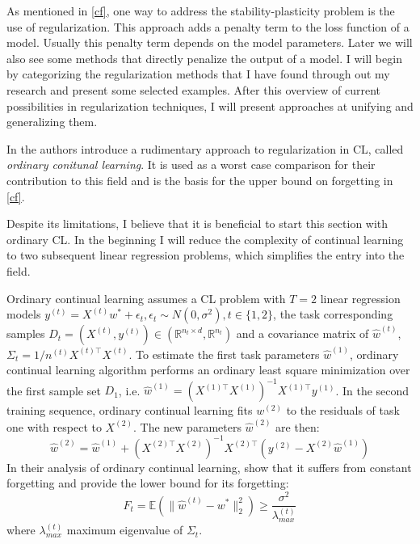 
As mentioned in \autoref{cf}, one way to address the stability-plasticity problem is the use of regularization. This approach adds a penalty term to the loss function of a model. Usually this penalty term depends on the model parameters. Later we will also see some methods that directly penalize the output of a model. I will begin by categorizing the regularization methods that I have found through out my research and present some selected examples. After this overview of current possibilities in regularization techniques, I will present approaches at unifying and generalizing them.

In \cite{evron2022,li2024fixeddesignanalysisregularizationbased} the authors introduce a rudimentary approach to regularization in CL, called \textit{ordinary conitunal learning}. It is used as a worst case comparison for their contribution to this field and is the basis for the upper bound on forgetting in \autoref{cf}.

Despite its limitations, I believe that it is beneficial to start this section with ordinary CL. In the beginning I will reduce the complexity of continual learning to two subsequent linear regression problems, which simplifies the entry into the field.

Ordinary continual learning \cite{evron2022,li2024fixeddesignanalysisregularizationbased, zhao2024statisticaltheoryregularizationbasedcontinual} assumes a CL problem with $T=2$ linear regression models $y^{(t)} = X^{(t)}w^* + \epsilon_t, \epsilon_t \sim N(0, \sigma^2), t \in \{1,2\}$, the task corresponding samples $D_t = (X^{(t)}, y^{(t)}) \in (\mathbb{R}^{n_t \times d}, \mathbb{R}^{n_t})$ and a covariance matrix of $\hat{w}^{(t)}$, $\Sigma_t = 1/n^{(t)} X^{(t)\top} X^{(t)}$. To estimate the first task parameters $\hat{w}^{(1)}$, ordinary continual learning algorithm performs an ordinary least square minimization over the first sample set $D_1$, i.e. $\hat{w}^{(1)} = (X^{(1)\top}X^{(1)})^{-1}X^{(1)\top} y^{(1)}$. In the second training sequence, ordinary continual learning fits $w^{(2)}$ to the residuals of task one with respect to $X^{(2)}$. The new parameters $\hat{w}^{(2)}$ are then:
\begin{equation}
	\hat{w}^{(2)} = \hat{w}^{(1)} + (X^{(2)\top}X^{(2)})^{-1}X^{(2)\top} (y^{(2)} - X^{(2)}\hat{w}^{(1)})
\end{equation}
In their analysis of ordinary continual learning,\citeauthor{zhao2024statisticaltheoryregularizationbasedcontinual} \cite{zhao2024statisticaltheoryregularizationbasedcontinual} show that it suffers from constant forgetting and provide the lower bound for its forgetting:
\begin{equation}
	F_t = \mathbb{E}(\lVert \hat{w}^{(t)} - w^* \rVert_2^2) \geq \frac{\sigma^2}{\lambda_{max}^{(t)}}
\end{equation}
where $\lambda_{max}^{(t)}$ maximum eigenvalue of $\Sigma_t$.

